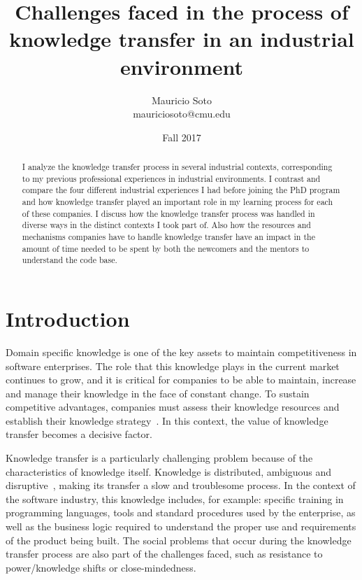 \documentclass[12pt, letterpaper]{article}
\title{Challenges faced in the process of knowledge transfer in an industrial environment}
\author{Mauricio Soto\\
mauriciosoto@cmu.edu
}
\date{Fall 2017}
\begin{document}
 
\begin{titlepage}
\maketitle


\begin{abstract}
I analyze the knowledge transfer process in several industrial contexts, corresponding to my 
previous professional experiences in industrial environments.
I contrast and compare the four different industrial experiences I had before joining the PhD program and 
how knowledge transfer played an important role in my learning process for each of these companies.
I discuss how the knowledge transfer process was handled in diverse ways in the distinct contexts I took part
of. Also how the resources and mechanisms companies have to handle knowledge transfer have an impact in the 
amount of time needed to be spent by both the newcomers and the mentors to understand the code base. 
\end{abstract}
\end{titlepage}
 
\section{Introduction}

Domain specific knowledge is one of the key assets to maintain competitiveness in 
software enterprises.
The role that this knowledge plays in the current market continues to grow, and it 
is critical for companies to be able to maintain, increase and manage their knowledge in the face 
of constant change. To sustain competitive advantages, companies must assess their knowledge resources and 
establish their knowledge strategy~\cite{civi00}. In this context, the value of knowledge transfer 
becomes a decisive factor.

Knowledge transfer is a particularly challenging problem because of the characteristics of
knowledge itself. Knowledge is distributed, ambiguous and 
disruptive~\cite{Newell06}, making its transfer a
slow and troublesome process. 
In the context of the software industry, this knowledge includes, for example: specific training in 
programming languages, tools and standard procedures used by the enterprise, as well as the
business logic required to understand the proper use and requirements of the product being built.
The social problems that occur during the knowledge transfer process are also part of the 
challenges faced, such as resistance to power/knowledge shifts or close-mindedness.
\end{document}
